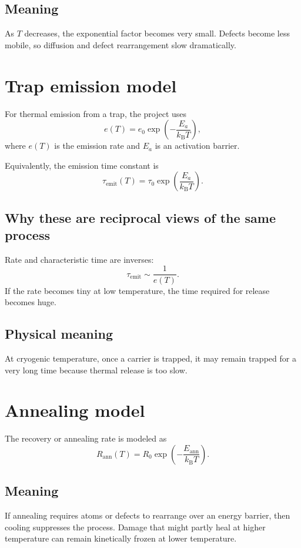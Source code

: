 \documentclass[11pt]{article}
\newcommand{\kb}{k_\mathrm{B}}
\begin{document}
\subsection{Meaning}
As $T$ decreases, the exponential factor becomes very small. Defects become less mobile, so diffusion and defect rearrangement slow dramatically.

\section{Trap emission model}
For thermal emission from a trap, the project uses
\begin{equation}
e(T) = e_0 \exp\!\left(-\frac{E_a}{\kb T}\right),
\end{equation}
where $e(T)$ is the emission rate and $E_a$ is an activation barrier.

Equivalently, the emission time constant is
\begin{equation}
\tau_{\mathrm{emit}}(T) = \tau_0 \exp\!\left(\frac{E_a}{\kb T}\right).
\end{equation}

\subsection{Why these are reciprocal views of the same process}
Rate and characteristic time are inverses:
\begin{equation}
\tau_{\mathrm{emit}} \sim \frac{1}{e(T)}.
\end{equation}
If the rate becomes tiny at low temperature, the time required for release becomes huge.

\subsection{Physical meaning}
At cryogenic temperature, once a carrier is trapped, it may remain trapped for a very long time because thermal release is too slow.

\section{Annealing model}
The recovery or annealing rate is modeled as
\begin{equation}
R_{\mathrm{ann}}(T) = R_0 \exp\!\left(-\frac{E_{\mathrm{ann}}}{\kb T}\right).
\end{equation}

\subsection{Meaning}
If annealing requires atoms or defects to rearrange over an energy barrier, then cooling suppresses the process. Damage that might partly heal at higher temperature can remain kinetically frozen at lower temperature.
\end{document}
